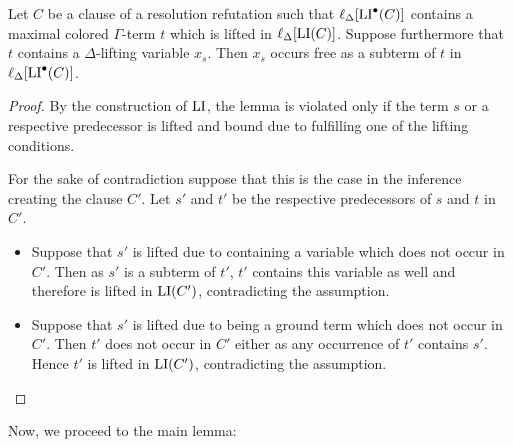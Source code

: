 \begin{lemma}
	\label{lemma:lifting_conditions}
	Let $C$ be a clause of a resolution refutation such that $\ell_{\Delta}[\operatorname{LI}^\bullet(C)]$ contains a maximal colored $\Gamma$-term $t$ which is lifted in $\ell_{\Delta}[\operatorname{LI}(C)]$.
	Suppose furthermore that $t$ contains a $\Delta$-lifting variable $x_s$.
	Then $x_s$ occurs free as a subterm of $t$ in $\ell_{\Delta}[\operatorname{LI}^\bullet(C)]$.
\end{lemma}
\begin{proof}
	By the construction of $\operatorname{LI}$, the lemma is violated only if the term $s$ or a respective predecessor is lifted and bound due to fulfilling one of the lifting conditions.

	For the sake of contradiction suppose that this is the case in the inference creating the clause $C'$.
	Let $s'$ and $t'$ be the respective predecessors of $s$ and $t$ in $C'$.

	\begin{itemize}
		\item Suppose that $s'$ is lifted due to containing a variable which does not occur in\nolinebreak{} $C'$.
			Then as $s'$ is a subterm of $t'$, $t'$ contains this variable as well and therefore is lifted in $\operatorname{LI}(C')$, contradicting the assumption.

		\item Suppose that $s'$ is lifted due to being a ground term which does not occur in\nolinebreak{} $C'$.
			Then $t'$ does not occur in $C'$ either as any occurrence of $t'$ contains $s'$. 
			Hence $t'$ is lifted in $\operatorname{LI}(C')$, contradicting the assumption.
			\qedhere
	\end{itemize}
\end{proof}

Now, we proceed to the main lemma:

